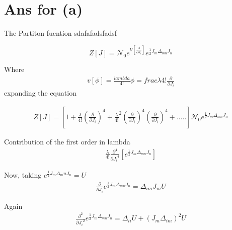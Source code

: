 \documentclass[12pt, letterpaper]{article}
\author{Noor E Mustafa Ferdous}
\title{}
\date{}
\newcommand*{\1}{\hspace{1pt}}
\begin{document}
    \maketitle
    
    \section*{Ans for (a)}
    
     The Partiton fucntion sdafafadsfadsf

    \begin{equation}
        Z[J] = \mathcal{N}_{0} e^{V[\frac{\partial}{\partial J_{i}}]} e^{\frac{1}{2} J_{m} \Delta _{mn} J_{n}}
    \end{equation}

    Where 
    \begin{align}
        v[\phi] = \frac{lambda}{4!} \phi = frac{\lambda}{4!}\frac{\partial}{\partial J_{i}}
    \end{align}
    expanding the equation 

    \begin{equation}
    \begin{split}
        Z[J] = [1 + \frac{\lambda}{4!}(\frac{\partial}{\partial J_{i}})^{4} + {\frac{\lambda}{4!}}^{2}(\frac{\partial}{\partial J_{i}})^{4}(\frac{\partial}{\partial J_{i}})^{4} + .....] \mathcal{N}_{0} e^{\frac{1}{2} J_{m} \Delta _{mn} J_{n}}
    \end{split}
    \end{equation}

    Contribution of the first order in lambda
    \begin{align}
        \frac{\lambda}{4!}\frac{\partial ^4}{{\partial J_{i}}^4} [e^{\frac{1}{2} J_{m} \Delta _{mn} J_{n}}]
    \end{align}
    
    Now, taking $e^{\frac{1}{2}J_{m}\Delta_{m}{n}J_{n}}=U$
    \begin{align}
        \frac{\partial}{\partial J_{i}} e^{\frac{1}{2}J_{m}\Delta_{mn}J_{n}} = \Delta_{im}J_{m}U 
    \end{align}

    Again    
    \begin{equation}
    \begin{split}
        \frac{\partial^2}{{\partial J_{i}}^2} e^{\frac{1}{2}J_{m}\Delta_{mn}J_{n}} = \Delta_{ii}U + (J_{m}\Delta_{im})^{2} U
    \end{split}
    \end{equation}
    
\end{document}
